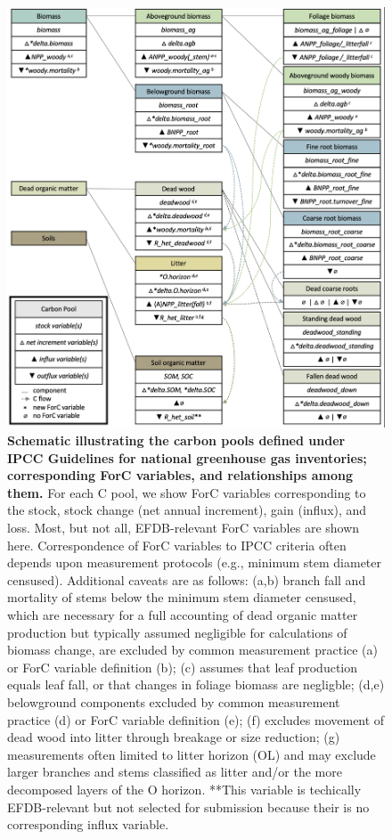 \documentclass[, manuscript]{copernicus}
\begin{document}
\begin{figure}
\includegraphics[width=14cm]{figures_tables/C_variable_mapping} \caption{\textbf{Schematic illustrating the carbon pools defined under IPCC Guidelines for national greenhouse gas inventories; corresponding ForC variables, and relationships among them.} For each C pool, we show ForC variables corresponding to the stock, stock change (net annual increment), gain (influx), and loss. Most, but not all, EFDB-relevant ForC variables are shown here. Correspondence of ForC variables to IPCC criteria often depends upon measurement protocols (e.g., minimum stem diameter censused). Additional caveats are as follows: (a,b) branch fall and mortality of stems below the minimum stem diameter censused, which are necessary for a full accounting of dead organic matter production but typically assumed negligible for calculations of biomass change, are excluded by common measurement practice (a) or ForC variable definition (b); (c) assumes that leaf production equals leaf fall, or that changes in foliage biomass are negligble; (d,e) belowground components excluded by common measurement practice (d) or ForC variable definition (e); (f) excludes movement of dead wood into litter through breakage or size reduction; (g) measurements often limited to litter horizon (OL) and may exclude larger branches and stems classified as litter and/or the more decomposed layers of the O horizon. **This variable is techically EFDB-relevant but not selected for submission because their is no corresponding influx variable.}\label{fig:fig_variable_mapping}
\end{figure}
\end{document}
